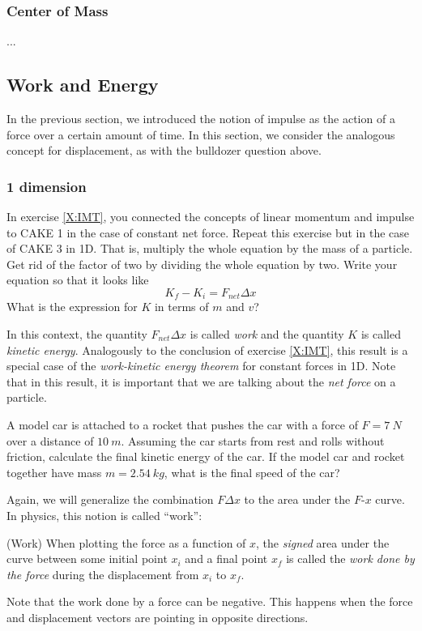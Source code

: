 \subsubsection{Center of Mass}
...

\subsection{Work and Energy}
In the previous section, we introduced the notion of impulse as the action of a force over a certain amount of time. 
In this section, we consider the analogous concept for displacement, as with the bulldozer question above.

\subsubsection{1 dimension}
\begin{exercise} 
In exercise \ref{X:IMT}, you connected the concepts of linear momentum and impulse to CAKE 1 in the case of constant net force. Repeat this exercise but in the case of CAKE 3 in 1D. That is, multiply the whole equation by the mass of a particle. Get rid of the factor of two by dividing the whole equation by two. Write your equation so that it looks like 
$$
K_f - K_i = F_{net} Δx
$$
What is the expression for $K$ in terms of $m$ and $v$? 
\end{exercise}
In this context, the quantity $F_{net}Δx$ is called {\em work} and the quantity $K$ is called {\em kinetic energy}.
Analogously to the conclusion of exercise \ref{X:IMT}, this result is a special case of the {\em work-kinetic energy theorem} for constant forces in 1D. 
Note that in this result, it is important that we are talking about the {\em net force} on a particle.

\begin{exercise}
A model car is attached to a rocket that pushes the car with a force of $F = 7\ N$ over a distance of $10\ m$.
Assuming the car starts from rest and rolls without friction, calculate the final kinetic energy of the car. If the model car and rocket together have mass $m = 2.54\ kg$, what is the final speed of the car?
\end{exercise}


Again, we will generalize the combination $F Δx$ to the area under the $F$-$x$ curve. In physics, this notion is called “work”:
\begin{definition}(Work)
When plotting the force as a function of $x$, the {\em signed} area under the curve between some initial point $x_i$ and a final point $x_f$ is called the {\em work done by the force} during the displacement from $x_i$ to $x_f$. 
\end{definition}
Note that the work done by a force can be negative. This happens when the force and displacement vectors are pointing in opposite directions.

